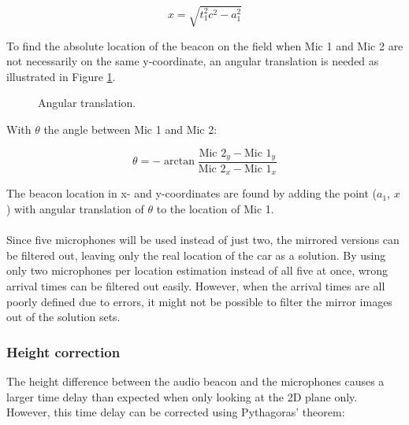 \documentclass[final]{scrreprt} %
\begin{document}
\begin{equation}
	x = \sqrt{t_1^2 c^2 - a_1^2}
\end{equation}

To find the absolute location of the beacon on the field when Mic 1 and Mic 2 are not necessarily on the same y-coordinate, an angular translation is needed as illustrated in Figure \ref{fig:angular-translation}.

\begin{figure} [H]
\centering
	\caption{Angular translation.}
	\label{fig:angular-translation}
\end{figure}

With $\theta$ the angle between Mic 1 and Mic 2:

\begin{equation}
	\theta = -\arctan{\frac{\text{Mic 2}_y - \text{Mic 1}_y}{\text{Mic 2}_x - \text{Mic 1}_x}}
\end{equation}

The beacon location in x- and y-coordinates are found by adding the point ($a_1$, $x$) with angular translation of $\theta$ to the location of Mic 1.
\\ \\
Since five microphones will be used instead of just two, the mirrored versions can be filtered out, leaving only the real location of the car as a solution.
By using only two microphones per location estimation instead of all five at once, wrong arrival times can be filtered out easily.
However, when the arrival times are all poorly defined due to errors, it might not be possible to filter the mirror images out of the solution sets.

\subsubsection{Height correction}
The height difference between the audio beacon and the microphones causes a larger time delay than expected when only looking at the 2D plane only.
However, this time delay can be corrected using Pythagoras' theorem:
\end{document}

